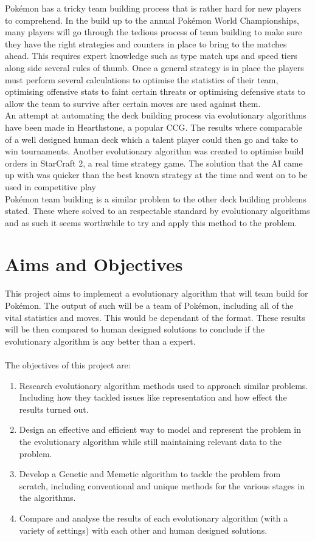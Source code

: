 \documentclass[a4paper]{article}
\newcommand{\Pokemon}{Pok\'{e}mon}
\begin{document}
\Pokemon{} has a tricky team building process that is rather hard for new players to comprehend. In the build up to the annual \Pokemon{} World Championships, many players will go through the tedious process of team building to make sure they have the right strategies and counters in place to bring to the matches ahead\cite{worldsOverview}. This requires expert knowledge such as type match ups and speed tiers along side several rules of thumb. Once a general strategy is in place the players must perform several calculations to optimise the statistics of their team, optimising offensive stats to faint certain threats or optimising defensive stats to allow the team to survive after certain moves are used against them.\\
An attempt at automating the deck building process via evolutionary algorithms have been made in Hearthstone, a popular CCG\cite{hearthstoneAI}. The results where comparable of a well designed human deck which a talent player could then go and take to win tournaments. Another evolutionary algorithm was created to optimise build orders in StarCraft 2, a real time strategy game. The solution that the AI came up with was quicker than the best known strategy at the time and went on to be used in competitive play\cite{starcraftEA}\\
\Pokemon{} team building is a similar problem to the other deck building problems stated. These where solved to an respectable standard by evolutionary algorithms and as such it seems worthwhile to try and apply this method to the problem.

\section{Aims and Objectives}
This project aims to implement a evolutionary algorithm that will team build for \Pokemon{}. The output of such will be a team of \Pokemon{}, including all of the vital statistics and moves. This would be dependant of the format. These results will be then compared to human designed solutions to conclude if the evolutionary algorithm is any better than a expert.\\
\\The objectives of this project are:
\begin{enumerate}
    \item Research evolutionary algorithm methods used to approach similar problems. Including how they tackled issues like representation and how effect the results turned out.
    \item Design an effective and efficient way to model and represent the problem in the evolutionary algorithm while still maintaining relevant data to the problem.
    \item Develop a Genetic and Memetic algorithm to tackle the problem from scratch, including conventional and unique methods for the various stages in the algorithms.
    \item Compare and analyse the results of each evolutionary algorithm (with a variety of settings) with each other and human designed solutions.
\end{enumerate}
\end{document}
